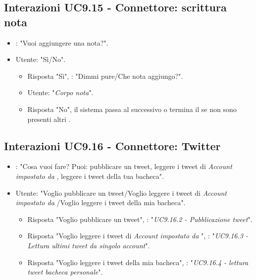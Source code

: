 \subsection{Interazioni UC9.15 - Connettore: scrittura nota}
\begin{itemize}
        \item {}: "Vuoi aggiungere una nota?".
        \item Utente: "Sì/No".
        \begin{itemize}
         \item{Risposta "Sì"}, : "Dimmi pure/Che nota aggiungo?".
         \item Utente: "{\it Corpo nota}".
         \item{Risposta "No"}, il sistema passa al  successivo o termina il  se non sono presenti altri .
         \end{itemize}
    \end{itemize}


\subsection{Interazioni UC9.16 - Connettore: Twitter}
 \begin{itemize}
        \item {}: "Cosa vuoi fare? Puoi: pubblicare un tweet, leggere i tweet di {\it Account impostato da }, leggere i tweet della tua bacheca".
        \item Utente: "Voglio pubblicare un tweet/Voglio leggere i tweet di {\it Account impostato da }/Voglio leggere i tweet della mia bacheca".
        \begin{itemize}
         \item{Risposta "Voglio pubblicare un tweet"}, : "{\it UC9.16.2 - Pubblicazione tweet}".
         \item{Risposta "Voglio leggere i tweet di {\it Account impostato da }"}, : "{\it UC9.16.3 - Lettura ultimi tweet da singolo account}".
         \item{Risposta "Voglio leggere i tweet della mia bacheca"}, : "{\it UC9.16.4 - lettura tweet bacheca personale}".
         \end{itemize}
    \end{itemize}


